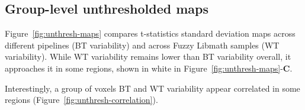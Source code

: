 \documentclass[conference]{IEEEtran}
\begin{document}
\subsection{Group-level unthresholded maps}

Figure~\ref{fig:unthresh-maps} compares t-statistics standard deviation maps
across different pipelines (BT variability) and across Fuzzy Libmath
samples (WT variability). While WT variability remains lower than BT
variability overall, it approaches it in some regions, shown in white in
Figure~\ref{fig:unthresh-maps}-\textbf{C}. 

Interestingly, a group of voxels 
BT and WT variability appear correlated in some regions
(Figure~\ref{fig:unthresh-correlation}).

\begin{figure}[ht]
  \end{figure}
\end{document}
